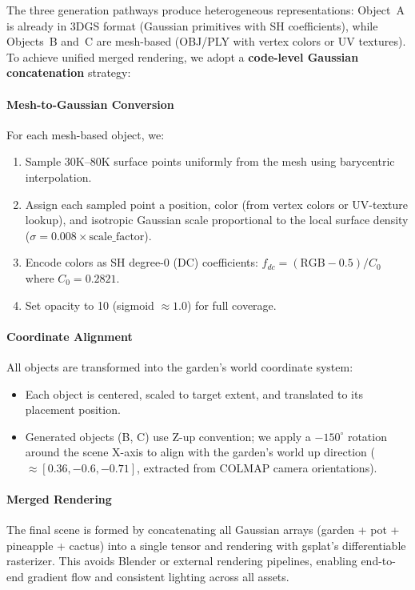 \documentclass[10pt,twocolumn,letterpaper]{article}
\begin{document}
The three generation pathways produce heterogeneous representations: Object~A is already in 3DGS format (Gaussian primitives with SH coefficients), while Objects~B and~C are mesh-based (OBJ/PLY with vertex colors or UV textures). To achieve unified merged rendering, we adopt a \textbf{code-level Gaussian concatenation} strategy:

\paragraph{Mesh-to-Gaussian Conversion} For each mesh-based object, we:
\begin{enumerate}
\item Sample 30K--80K surface points uniformly from the mesh using barycentric interpolation.
\item Assign each sampled point a position, color (from vertex colors or UV-texture lookup), and isotropic Gaussian scale proportional to the local surface density ($\sigma = 0.008 \times \text{scale\_factor}$).
\item Encode colors as SH degree-0 (DC) coefficients: $f_{dc} = (\text{RGB} - 0.5) / C_0$ where $C_0 = 0.2821$.
\item Set opacity to 10 (sigmoid $\approx 1.0$) for full coverage.
\end{enumerate}

\paragraph{Coordinate Alignment} All objects are transformed into the garden's world coordinate system:
\begin{itemize}
\item Each object is centered, scaled to target extent, and translated to its placement position.
\item Generated objects (B, C) use Z-up convention; we apply a $-150^\circ$ rotation around the scene X-axis to align with the garden's world up direction ($\approx [0.36, -0.6, -0.71]$, extracted from COLMAP camera orientations).
\end{itemize}

\paragraph{Merged Rendering} The final scene is formed by concatenating all Gaussian arrays (garden + pot + pineapple + cactus) into a single tensor and rendering with gsplat's differentiable rasterizer. This avoids Blender or external rendering pipelines, enabling end-to-end gradient flow and consistent lighting across all assets.
\end{document}
